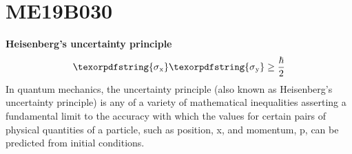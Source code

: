 \section{ME19B030}
\textbf{Heisenberg's uncertainty principle}
\begin{equation}
{\texorpdfstring{\sigma\textsubscript{x}}\texorpdfstring{\sigma\textsubscript{y}}}\geq\frac{\hbar}{2} 
\end{equation}
In quantum mechanics, the uncertainty principle (also known as Heisenberg's uncertainty principle) is any of a variety of mathematical inequalities asserting a fundamental limit to the accuracy with which the values for certain pairs of physical quantities of a particle, such as position, x, and momentum, p, can be predicted from initial conditions.
